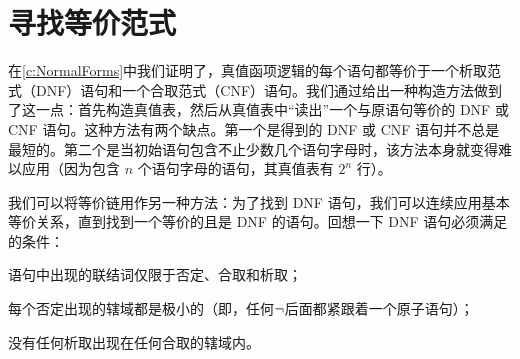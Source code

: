 \section{寻找等价范式}

在\cref{c:NormalForms}中我们证明了，真值函项逻辑的每个语句都等价于一个析取范式（DNF）语句和一个合取范式（CNF）语句。我们通过给出一种构造方法做到了这一点：首先构造真值表，然后从真值表中“读出”一个与原语句等价的 DNF 或 CNF 语句。这种方法有两个缺点。第一个是得到的 DNF 或 CNF 语句并不总是最短的。第二个是当初始语句包含不止少数几个语句字母时，该方法本身就变得难以应用（因为包含 $n$ 个语句字母的语句，其真值表有 $2^n$ 行）。

我们可以将等价链用作另一种方法：为了找到 DNF 语句，我们可以连续应用基本等价关系，直到找到一个等价的且是 DNF 的语句。回想一下 DNF 语句必须满足的条件：

\begin{compactlist}
	\item[(\textsc{dnf1})] 语句中出现的联结词仅限于否定、合取和析取；
	\item[(\textsc{dnf2})] 每个否定出现的辖域都是极小的（即，任何$\neg$后面都紧跟着一个原子语句）；
	\item[(\textsc{dnf3})] 没有任何析取出现在任何合取的辖域内。
\end{compactlist}

